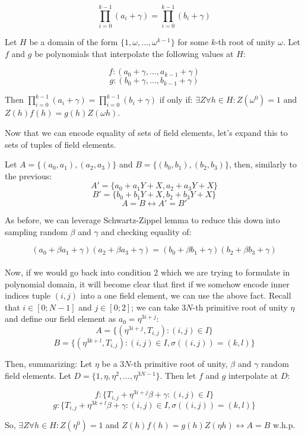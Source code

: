 \documentclass[../lecture-notes.tex]{subfiles}
\begin{document}
\[\prod_{i=0}^{k-1} (a_i + \gamma) = \prod_{i=0}^{k-1} (b_i + \gamma)\]

Let $H$ be a domain of the form \(\{1, \omega, \dots, \omega^{k-1}\}\) for some $k$-th root of unity $\omega$. Let $f$ and $g$ be polynomials that interpolate the following values at $H$:

\[f: (a_0 + \gamma, \ldots, a_{k-1} + \gamma)\]
\[g: (b_0 + \gamma, \ldots, b_{k-1} + \gamma)\]

Then \(\prod_{i=0}^{k-1} (a_i + \gamma) = \prod_{i=0}^{k-1} (b_i + \gamma)\) if only if: \(\exists Z \forall h \in H: Z(\omega^{0}) = 1\) and  \(Z(h)f(h) = g(h)Z(\omega h)\).

Now that we can encode equality of sets of field elements, let's expand this to sets of tuples of field elements.

Let \(A = \{(a_0, a_1), (a_2, a_3)\}\) and \(B = \{(b_0, b_1), (b_2, b_3)\}\), then, similarly to the previous:
\[A' = \{a_0 + a_1Y + X, a_2 + a_3Y + X\}\]
\[B' = \{b_0 + b_1Y + X, b_2 + b_3Y + X\}\]
\[A = B \leftrightarrow A' = B'\]

As before, we can leverage Schwartz-Zippel lemma to reduce this down into sampling random $\beta$ and $\gamma$ and checking equality of:

\[(a_0 + \beta a_1 + \gamma)(a_2 + \beta a_3 + \gamma) = (b_0 + \beta b_1 + \gamma)(b_2 + \beta b_3 + \gamma)\]
\\
Now, if we would go back into condition 2 which we are trying to formulate in polynomial domain, it will become clear that first if we somehow encode inner indices tuple $(i, j)$ into a one field element, we can use the above fact.
Recall that $i \in [0; N-1]$ and $j \in [0; 2]$; we can take $3N$-th primitive root of unity $\eta$ and define our field element as \(a_0 = \eta^{3i + j}\):
\[A = \{(\eta^{3i+j}, T_{i,j}) : (i, j) \in I\}\]
\[B = \{(\eta^{3k+l}, T_{i,j}) : (i, j) \in I, \sigma((i, j)) = (k, l)\}\]

Then, summarizing:
Let $\eta$ be a $3N$-th primitive root of unity, $\beta$ and $\gamma$ random field elements. Let $D = \{1, \eta, \eta^2, \ldots, \eta^{3N-1}\}$. Then let $f$ and $g$ interpolate at $D$:

\[f: \{T_{i,j} + \eta^{3i+j}\beta + \gamma : (i, j) \in I\}\]
\[g: \{T_{i,j} + \eta^{3k+l}\beta + \gamma : (i, j) \in I, \sigma((i, j)) = (k, l)\}\]

So, \(\exists Z \forall h \in H: Z(\eta^{0}) = 1\) and  \(Z(h)f(h) = g(h)Z(\eta h) \leftrightarrow A = B\) w.h.p.
\end{document}
